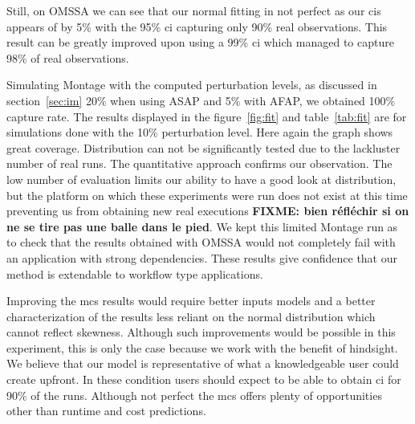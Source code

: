 \documentclass[10pt,conference,compsocconf]{IEEEtran}
\begin{document}
Still, on OMSSA we can see that our normal fitting in not perfect as our \acp{ci}
appears of by 5\% with the 95\% \ac{ci} capturing only 90\% real observations.
This result can be greatly improved upon using a 99\% \ac{ci} which managed to
capture 98\% of real observations.

Simulating Montage with the computed perturbation levels, as discussed in
section~\ref{sec:im} 20\% when using ASAP and 5\% with AFAP, we obtained 100\%
capture rate. The results displayed in the figure~\ref{fig:fit} and
table~\ref{tab:fit} are for simulations done with the 10\% perturbation level.   
Here again the graph shows great coverage. Distribution can not be significantly
tested due to the lackluster number of real runs. The quantitative approach
confirms our observation. The low number of evaluation limits our ability to
have a good look at distribution, but the platform on which these experiments
were run does not exist at this time preventing us from obtaining new real
executions \textbf{FIXME: bien réfléchir si on ne se tire pas une balle dans le
  pied}.
 We kept this limited Montage run as to check that the results
obtained with OMSSA would not completely fail with an application with strong
dependencies. These results give confidence that our method is extendable to
workflow type applications.  

Improving the \ac{mcs} results would require better inputs models and a better
characterization of the results less reliant on the normal distribution which
cannot reflect skewness. Although such improvements would be possible in this
experiment, this is only the case because we work with the benefit of hindsight.
We believe that our model is representative of what a knowledgeable user could
create upfront. In these condition users should expect to be able to obtain
\ac{ci} for 90\% of the runs. Although not perfect the \ac{mcs} offers plenty of
opportunities other than runtime and cost predictions.
\end{document}
